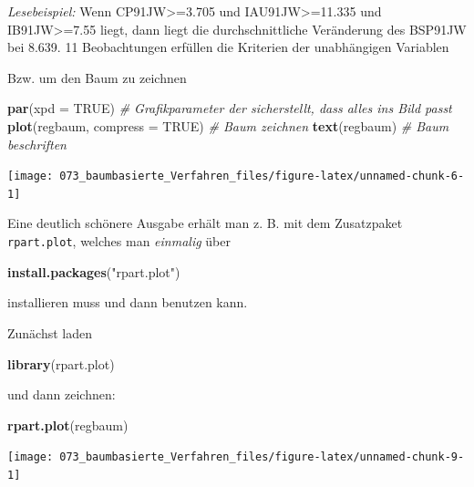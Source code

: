 \documentclass[12pt,]{book}
\makeatletter
\newenvironment{Shaded}{\begin{snugshade}}{\end{snugshade}}
\newcommand{\KeywordTok}[1]{\textcolor[rgb]{0.13,0.29,0.53}{\textbf{{#1}}}}
\newcommand{\DataTypeTok}[1]{\textcolor[rgb]{0.13,0.29,0.53}{{#1}}}
\newcommand{\StringTok}[1]{\textcolor[rgb]{0.31,0.60,0.02}{{#1}}}
\newcommand{\CommentTok}[1]{\textcolor[rgb]{0.56,0.35,0.01}{\textit{{#1}}}}
\newcommand{\OtherTok}[1]{\textcolor[rgb]{0.56,0.35,0.01}{{#1}}}
\newcommand{\NormalTok}[1]{{#1}}
\newenvironment{kframe}{%
\medskip{}
\setlength{\fboxsep}{.8em}
 \def\at@end@of@kframe{}%
 \ifinner\ifhmode%
  \def\at@end@of@kframe{\end{minipage}}%
  \begin{minipage}{\columnwidth}%
 \fi\fi%
 \def\FrameCommand##1{\hskip\@totalleftmargin \hskip-\fboxsep
 \colorbox{shadecolor}{##1}\hskip-\fboxsep
     \hskip-\linewidth \hskip-\@totalleftmargin \hskip\columnwidth}%
 \MakeFramed {\advance\hsize-\width
   \@totalleftmargin\z@ \linewidth\hsize
   \@setminipage}}%
 {\par\unskip\endMakeFramed%
 \at@end@of@kframe}
\renewenvironment{Shaded}{\begin{kframe}}{\end{kframe}}
\makeatother
\begin{document}
\emph{Lesebeispiel:} Wenn CP91JW\textgreater{}=3.705 und
IAU91JW\textgreater{}=11.335 und IB91JW\textgreater{}=7.55 liegt, dann
liegt die durchschnittliche Veränderung des BSP91JW bei 8.639. 11
Beobachtungen erfüllen die Kriterien der unabhängigen Variablen

Bzw. um den Baum zu zeichnen

\begin{Shaded}
\begin{Highlighting}[]
\KeywordTok{par}\NormalTok{(}\DataTypeTok{xpd =} \OtherTok{TRUE}\NormalTok{) }\CommentTok{# Grafikparameter der sicherstellt, dass alles ins Bild passt}
\KeywordTok{plot}\NormalTok{(regbaum, }\DataTypeTok{compress =} \OtherTok{TRUE}\NormalTok{) }\CommentTok{# Baum zeichnen}
\KeywordTok{text}\NormalTok{(regbaum) }\CommentTok{# Baum beschriften}
\end{Highlighting}
\end{Shaded}

\begin{center}\texttt{[image: 073\_baumbasierte\_Verfahren\_files/figure-latex/unnamed-chunk-6-1]} \end{center}

Eine deutlich schönere Ausgabe erhält man z. B. mit dem Zusatzpaket
\texttt{rpart.plot}, welches man \emph{einmalig} über

\begin{Shaded}
\begin{Highlighting}[]
\KeywordTok{install.packages}\NormalTok{(}\StringTok{"rpart.plot"}\NormalTok{)}
\end{Highlighting}
\end{Shaded}

installieren muss und dann benutzen kann.

Zunächst laden

\begin{Shaded}
\begin{Highlighting}[]
\KeywordTok{library}\NormalTok{(rpart.plot)}
\end{Highlighting}
\end{Shaded}

und dann zeichnen:

\begin{Shaded}
\begin{Highlighting}[]
\KeywordTok{rpart.plot}\NormalTok{(regbaum)}
\end{Highlighting}
\end{Shaded}

\begin{center}\texttt{[image: 073\_baumbasierte\_Verfahren\_files/figure-latex/unnamed-chunk-9-1]} \end{center}
\end{document}
